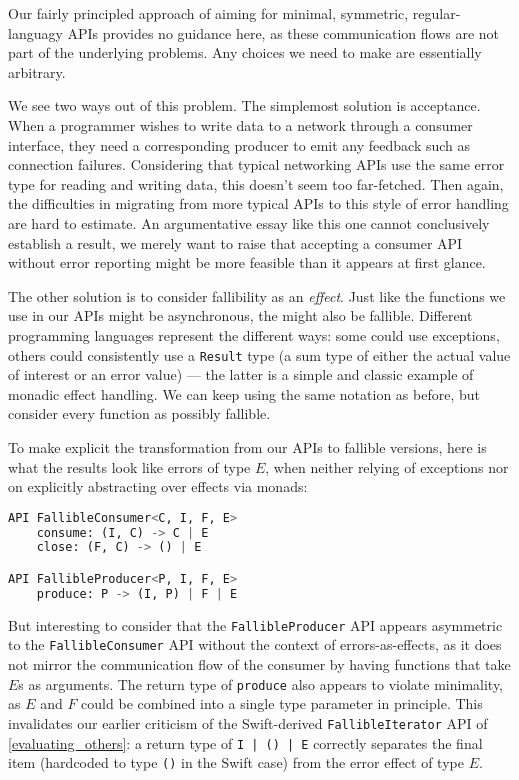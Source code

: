 \documentclass[sigplan,screen,10pt,anonymous,review]{acmart}
\begin{document}
Our fairly principled approach of aiming for  minimal, symmetric, regular-languagy APIs provides no guidance here, as these communication flows are not part of the underlying problems. Any choices we need to make are essentially arbitrary.

We see two ways out of this problem. The simplemost solution is acceptance. When a programmer wishes to write data to a network through a consumer interface, they need a corresponding producer to emit any feedback such as connection failures. Considering that typical networking APIs use the same error type for reading and writing data, this doesn't seem too far-fetched. Then again, the difficulties in migrating from more typical APIs to this style of error handling are hard to estimate. An argumentative essay like this one cannot conclusively establish a result, we merely want to raise that accepting a consumer API without error reporting might be more feasible than it appears at first glance.

The other solution is to consider fallibility as an \textit{effect}. Just like the functions we use in our APIs might be asynchronous, the might also be fallible. Different programming languages represent the different ways: some could use exceptions, others could consistently use a \texttt{Result} type (a sum type of either the actual value of interest or an error value) --- the latter is a simple and classic example of monadic effect handling. We can keep using the same notation as before, but consider every function as possibly fallible.

To make explicit the transformation from our APIs to fallible versions, here is what the results look like errors of type $E$, when neither relying of exceptions nor on explicitly abstracting over effects via monads:

\begin{lstlisting}[language=Python]
API FallibleConsumer<C, I, F, E>
    consume: (I, C) -> C | E
    close: (F, C) -> () | E

API FallibleProducer<P, I, F, E>
    produce: P -> (I, P) | F | E
\end{lstlisting}

But interesting to consider that the \texttt{FallibleProducer} API appears asymmetric to the \texttt{FallibleConsumer} API without the context of errors-as-effects, as it does not mirror the communication flow of the consumer by having functions that take $E$s as arguments. The return type of \texttt{produce} also appears to violate minimality, as $E$ and $F$ could be combined into a single type parameter in principle. This invalidates our earlier criticism of the Swift-derived \texttt{FallibleIterator} API of \cref{evaluating_others}: a return type of \texttt{I | () | E} correctly separates the final item (hardcoded to type \texttt{()} in the Swift case) from the error effect of type $E$.
\end{document}
